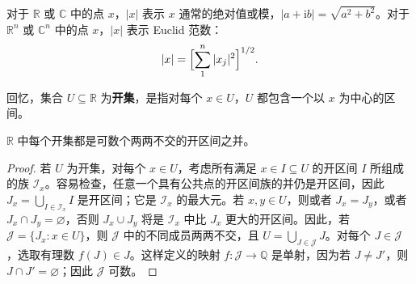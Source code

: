 \documentclass[../../main.tex]{subfiles}%
\begin{document}

\begin{definition}\label{definition:ch00-absolute-value-norm}
对于 $\mathbb{R}$ 或 $\mathbb{C}$ 中的点 $x$，$|x|$ 表示 $x$ 通常的绝对值或模，$|a+\mathrm{i}b|=\sqrt{a^2+b^2}$。对于 $\mathbb{R}^n$ 或 $\mathbb{C}^n$ 中的点 $x$，$|x|$ 表示 Euclid 范数：
\begin{align*}
|x|=\Bigl[\sum_{1}^{n}|x_j|^2\Bigr]^{1/2}.
\end{align*}
\end{definition}



\begin{definition}[实数集中的开集]\label{definition:ch00-open-real-set}
回忆，集合 $U\subseteq\mathbb{R}$ 为\textbf{开集}，是指对每个 $x\in U$，$U$ 都包含一个以 $x$ 为中心的区间。
\end{definition}


\begin{proposition}\label{proposition:ch00-open-interval-decomposition}
$\mathbb{R}$ 中每个开集都是可数个两两不交的开区间之并。
\end{proposition}

\begin{proof}
若 $U$ 为开集，对每个 $x\in U$，考虑所有满足 $x\in I\subseteq U$ 的开区间 $I$ 所组成的族 $\mathscr{I}_x$。容易检查，任意一个具有公共点的开区间族的并仍是开区间，因此 $J_x=\bigcup_{I\in\mathscr{I}_x}I$ 是开区间；它是 $\mathscr{I}_x$ 的最大元。若 $x,y\in U$，则或者 $J_x=J_y$，或者 $J_x\cap J_y=\varnothing$，否则 $J_x\cup J_y$ 将是 $\mathscr{I}_x$ 中比 $J_x$ 更大的开区间。因此，若 $\mathscr{J}=\{J_x:x\in U\}$，则 $\mathscr{J}$ 中的不同成员两两不交，且 $U=\bigcup_{J\in\mathscr{J}}J$。对每个 $J\in\mathscr{J}$，选取有理数 $f(J)\in J$。这样定义的映射 $f:\mathscr{J}\to\mathbb{Q}$ 是单射，因为若 $J\ne J'$，则 $J\cap J'=\varnothing$；因此 $\mathscr{J}$ 可数。
\end{proof}
\end{document}
